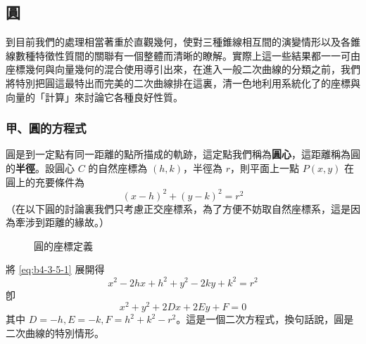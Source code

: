 \subsection{圓}
\label{sec:b4-3-5}

到目前我們的處理相當著重於直觀幾何，使對三種錐線相互間的演變情形以及各錐線數種特徵性質間的關聯有一個整體而清晰的瞭解。實際上這一些結果都一一可由座標幾何與向量幾何的混合使用導引出來，在進入一般二次曲線的分類之前，我們將特別把圓這最特出而完美的二次曲線排在這裏，清一色地利用系統化了的座標與向量的「計算」來討論它各種良好性質。

\subsubsection*{甲、圓的方程式}

圓是到一定點有同一距離的點所描成的軌跡，這定點我們稱為\textbf{圓心}，這距離稱為圓的\textbf{半徑}。設圓心 $C$ 的自然座標為 $(h,k)$，半徑為 $r$，則平面上一點 $P(x,y)$ 在圓上的充要條件為
\begin{equation}
(x-h)^2 + (y-k)^2 = r^2 \label{eq:b4-3-5-1}
\end{equation}
（在以下圓的討論裏我們只考慮正交座標系，為了方便不妨取自然座標系，這是因為牽涉到距離的緣故。）

\begin{figure}[htbp]
\centering
{}
\caption{圓的座標定義}
\label{fig:b4-3-32}
\end{figure}

將 \eqref{eq:b4-3-5-1} 展開得
\[ x^2 - 2hx + h^2 + y^2 - 2ky + k^2 = r^2 \]
卽
\begin{equation}
x^2 + y^2 + 2Dx + 2Ey + F = 0 \label{eq:b4-3-5-2}
\end{equation}
其中 $D = -h, E = -k, F = h^2 + k^2 - r^2$。這是一個二次方程式，換句話說，圓是二次曲線的特別情形。

